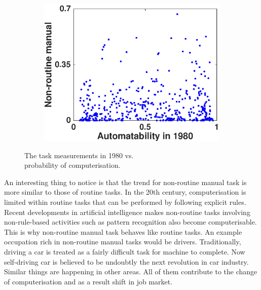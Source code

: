 \documentclass[11pt]{report}
\numberwithin{equation}{chapter}
\begin{document}
\begin{spacing}{2}
\begin{figure}[!htb]
\begin{subfigure}{0.5\textwidth}
	\includegraphics[scale = 0.5]{non-routine_manual.eps}
\end{subfigure}

\caption{The task measurements in 1980 vs. \\probability of computerisation.}
\label{fig:1980}
\end{figure}



An interesting thing to notice is that the trend for non-routine manual task is more similar to those of routine tasks. In the 20th century, computerisation is limited within routine tasks that can be performed by following explicit rules. Recent developments in artificial intelligence makes non-routine tasks involving non-rule-based activities such as pattern recognition also become computerisable. This is why non-routine manual task behaves like routine tasks. An example occupation rich in non-routine manual tasks would be drivers. Traditionally, driving a car is treated as a fairly difficult task for machine to complete. Now self-driving car is believed to be undoubtly the next revolution in car industry. Similar things are happening in other areas. All of them contribute to the change of computerisation and as a result shift in job market.



\begin{figure}[htb]


\end{figure}
\end{spacing}
\end{document}
